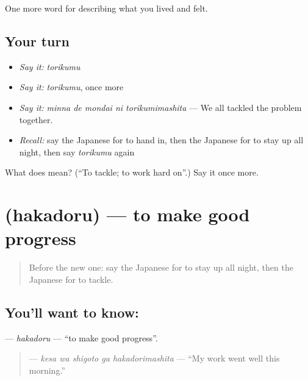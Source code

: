 \begin{grammarlens}[title={What you've built}]
One more word for describing what you lived and felt.
\end{grammarlens}

\subsection*{Your turn}
\begin{itemize}
\raggedright
  \item \emph{Say it:} \emph{torikumu}
  \item \emph{Say it:} \emph{torikumu}, once more
  \item \emph{Say it:} \emph{minna de mondai ni torikumimashita} — We all tackled the problem together.
  \item \emph{Recall:} say the Japanese for to hand in, then the Japanese for to stay up all night, then say \emph{torikumu} again
\end{itemize}

\begin{tcolorbox}[breakable,colback=teal!4,colframe=teal!35!black,title={Before you move on}]
What does  mean? (\textquotedblleft{}To tackle; to work hard on\textquotedblright{}.) Say it once more.
\end{tcolorbox}
\section[\texorpdfstring{\ja{はかどる} (hakadoru)}{はかどる (hakadoru)}]{ (hakadoru) — to make good progress}

\label{lesson:JA-C454-hakadoru}



\begin{quote}
Before the new one: say the Japanese for to stay up all night, then the Japanese for to tackle.
\end{quote}

\subsection*{You'll want to know: }
\textbf{} — \emph{hakadoru} — \textquotedblleft{}to make good progress\textquotedblright{}.

\begin{quote}
\textbf{  } — \emph{kesa wa shigoto ga hakadorimashita} — \textquotedblleft{}My work went well this morning.\textquotedblright{}
\end{quote}

